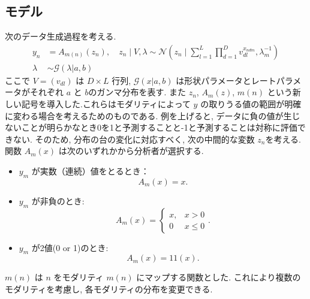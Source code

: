 \documentclass[a4paper,12ptc]{jsarticle} %
\newcommand{\gam}{\mathcal{G}}
\newcommand{\one}{1\!\!1}
\begin{document}
\subsection{モデル}
次のデータ生成過程を考える.
\begin{align}
y_{n} &= A_{m(n)}(z_{n}), \quad z_{n} \mid V, \lambda \sim \mathcal{N}\left(z_n \mid \sum_{l=1}^L \prod_{d=1}^Dv_{dl}^{x_{ndm}}, \lambda^{-1}_m\right)  \label{eq_mod1}\\
\lambda & \sim \gam(\lambda | a,b) \nonumber
\end{align}
ここで $V=(v_{dl})$ は $D \times L$  行列, $\gam(x|a,b)$ は形状パラメータとレートパラメータがそれぞれ $a$ と $b$のガンマ分布を表す. また $z_n$, $A_{m}(z)$, $m(n)$ という新しい記号を導入した.これらはモダリティによって $y$ の取りうる値の範囲が明確に変わる場合を考えるためのものである.
例を上げると, データに負の値が生じないことが明らかなとき0を1と予測することと-1と予測することは対称に評価できない.
そのため, 分布の台の変化に対応すべく, 次の中間的な変数 $z_n$を考える.
関数 $A_m(x)$ は次のいずれかから分析者が選択する.
\begin{itemize}
\item $y_m$ が実数（連続）値をとるとき： 
$$
A_m(x)=x.
$$
\item $y_m$ が非負のとき:
$$
A_m(x)=\begin{cases}x, &x>0\\0 &x\leq 0\end{cases}.
$$
\item
$y_m$ が2値(0 or 1)のとき:
$$
A_m(x)=\one(x).
$$
\end{itemize}
$m(n)$ は $n$ をモダリティ $m(n)$ にマップする関数とした. これにより複数のモダリティを考慮し, 各モダリティの分布を変更できる.
\end{document}
